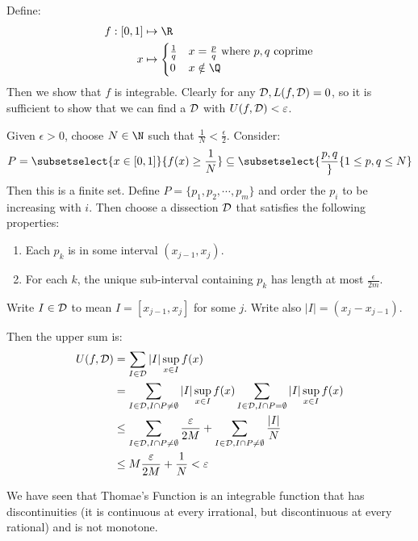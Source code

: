 \documentclass[../Main.tex]{subfiles}
\begin{document}
\begin{example}
    Define:
    \begin{align*}
        f : [0, 1] &\mapsto \R \\
        x &\mapsto
        \begin{cases}
            \frac{1}{q} & x = \frac{p}{q} \text{ where } p, q \text{ coprime} \\
            0 & x \notin \Q
        \end{cases}
    \end{align*}
    Then we show that $f$ is integrable. Clearly for any $\mathcal{D}, L(f, \mathcal{D}) = 0$, so it is sufficient to show that we can find a $\mathcal{D}$ with $U(f, \mathcal{D}) < \varepsilon$.

    Given $\epsilon > 0$, choose $N \in \N$ such that $\frac{1}{N} < \frac{\epsilon}{2}$. Consider:
    \begin{equation*}
        P = \subsetselect{x \in [0, 1]}{f(x) \geq \frac{1}{N}} \subseteq \subsetselect{\frac{p, q}}{1 \leq p, q \leq N}
    \end{equation*}
    Then this is a finite set. Define $P = \{p_1, p_2, \cdots, p_m\}$ and order the $p_i$ to be increasing with $i$. Then choose a dissection $\mathcal{D}$ that satisfies the following properties:
    \begin{enumerate}
        \item Each $p_k$ is in some interval $(x_{j - 1}, x_j)$.
        \item For each $k$, the unique sub-interval containing $p_k$ has length at most $\frac{\epsilon}{2m}$.
    \end{enumerate}
    Write $I \in \mathcal{D}$ to mean $I = [x_{j-1}, x_j]$ for some $j$. Write also $|I| = (x_j - x_{j-1})$.

    Then the upper sum is:
    \begin{align*}
        U(f, \mathcal{D}) &= \sum_{I \in \mathcal{D}} |I| \sup_{x \in I} f(x) \\
        &= \sum_{I \in \mathcal{D}, I \cap P \neq \emptyset} |I| \sup_{x \in I} f(x) \sum_{I \in \mathcal{D}, I \cap P = \emptyset} |I| \sup_{x \in I} f(x) \\
        &\leq \sum_{I \in \mathcal{D}, I \cap P \neq \emptyset} \frac{\varepsilon}{2M} + \sum_{I \in \mathcal{D}, I \cap P \neq \emptyset} \frac{|I|}{N} \\
        &\leq M \frac{\varepsilon}{2M} + \frac{1}{N} < \varepsilon
    \end{align*}
\end{example}
\begin{remark}
    We have seen that Thomae's Function is an integrable function that has discontinuities (it is continuous at every irrational, but discontinuous at every rational) and is not monotone.
\end{remark}
\end{document}
